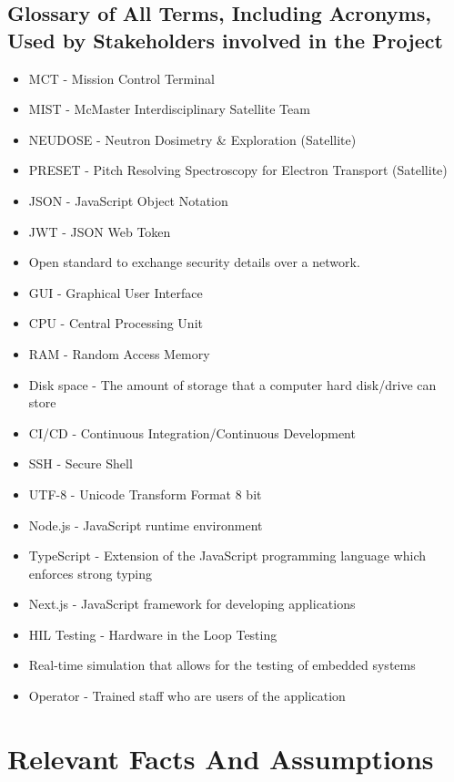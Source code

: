\documentclass[12pt]{article}
\begin{document}
\subsection{Glossary of All Terms, Including Acronyms, Used by Stakeholders
involved in the Project}
\begin{itemize}
    \item MCT - Mission Control Terminal
    \item MIST - McMaster Interdisciplinary Satellite Team
    \item NEUDOSE - Neutron Dosimetry \& Exploration (Satellite)
    \item PRESET - Pitch Resolving Spectroscopy for Electron Transport (Satellite)
    \item JSON - JavaScript Object Notation
    \item JWT - JSON Web Token
    \item Open standard to exchange security details over a network.
    \item GUI - Graphical User Interface
    \item CPU - Central Processing Unit
    \item RAM - Random Access Memory
    \item Disk space - The amount of storage that a computer hard disk/drive can store
    \item CI/CD - Continuous Integration/Continuous Development
    \item SSH - Secure Shell
    \item UTF-8 - Unicode Transform Format 8 bit
    \item Node.js - JavaScript runtime environment
    \item TypeScript - Extension of the JavaScript programming language which enforces strong typing
    \item Next.js - JavaScript framework for developing applications
    \item HIL Testing - Hardware in the Loop Testing
    \item Real-time simulation that allows for the testing of embedded systems
    \item Operator - Trained staff who are users of the application

\end{itemize}

\section{Relevant Facts And Assumptions}
\end{document}
